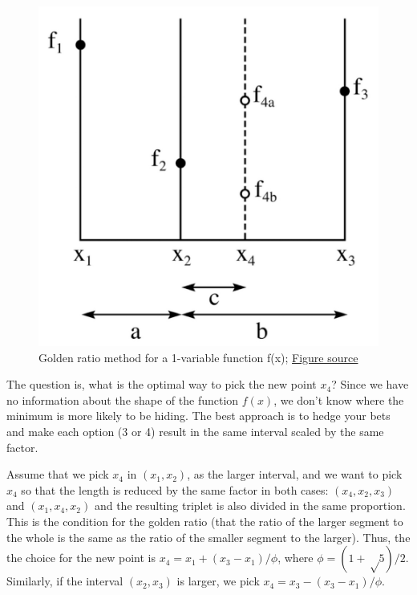 \documentclass[
  letterpaper,
  DIV=11,
  numbers=noendperiod]{scrreprt}
\begin{document}
\begin{figure}[H]

{\centering \includegraphics{figs/golden_search.png}

}

\caption{Golden ratio method for a 1-variable function f(x);
\href{https://en.wikipedia.org/wiki/Golden-section_search\#/media/File:GoldenSectionSearch.png}{Figure
source}}

\end{figure}%

The question is, what is the optimal way to pick the new point \(x_4\)?
Since we have no information about the shape of the function \(f(x)\),
we don't know where the minimum is more likely to be hiding. The best
approach is to hedge your bets and make each option (3 or 4) result in
the same interval scaled by the same factor.

Assume that we pick \(x_4\) in \((x_1, x_2)\), as the larger interval,
and we want to pick \(x_4\) so that the length is reduced by the same
factor in both cases: \((x_4, x_2, x_3)\) and \((x_1, x_4, x_2)\) and
the resulting triplet is also divided in the same proportion. This is
the condition for the golden ratio (that the ratio of the larger segment
to the whole is the same as the ratio of the smaller segment to the
larger). Thus, the the choice for the new point is
\(x_4 = x_1 + (x_3 - x_1)/\phi\), where \(\phi = (1 + √5)/2\).
Similarly, if the interval \((x_2,x_3)\) is larger, we pick
\(x_4 = x_3 - (x_3 - x_1)/\phi\).
\end{document}

